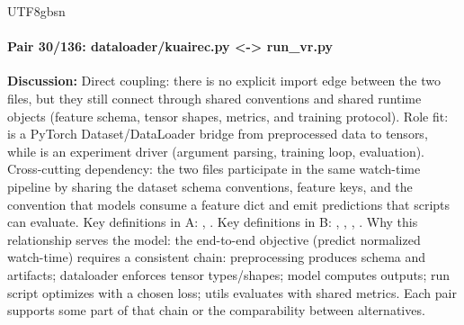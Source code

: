 \documentclass[11pt]{article}
\begin{document}
\begin{CJK*}{UTF8}{gbsn}
\paragraph{Pair 30/136: dataloader/kuairec.py <-> run\_vr.py}
\textbf{Discussion:} Direct coupling: there is no explicit import edge between the two files, but they still connect through shared conventions and shared runtime objects (feature schema, tensor shapes, metrics, and training protocol). Role fit: \texttt{} is a PyTorch Dataset/DataLoader bridge from preprocessed data to tensors, while \texttt{} is an experiment driver (argument parsing, training loop, evaluation). Cross-cutting dependency: the two files participate in the same watch-time pipeline by sharing the dataset schema conventions, feature keys, and the convention that models consume a feature dict and emit predictions that scripts can evaluate. Key definitions in A: \texttt{}, \texttt{}. Key definitions in B: \texttt{}, \texttt{}, \texttt{}, \texttt{}. Why this relationship serves the model: the end-to-end objective (predict normalized watch-time) requires a consistent chain: preprocessing produces schema and artifacts; dataloader enforces tensor types/shapes; model computes outputs; run script optimizes with a chosen loss; utils evaluates with shared metrics. Each pair supports some part of that chain or the comparability between alternatives.


\end{CJK*}
\end{document}
